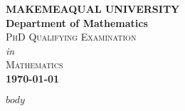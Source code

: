\documentclass[12pt]{article}
\begin{document}
\begin{titlepage}
	\begin{center}
        \textbf{\LARGE{MAKEMEAQUAL UNIVERSITY}} \\
                \vspace{2mm} %
            \textbf{\Large{Department of Mathematics}}\\
                \vspace{15mm} %
            \LARGE\textsc{PhD Qualifying Examination} \\
                \vspace{2mm} %
            \Large \textit{in} \\
            \Large\textsc {Mathematics}\\
                \vspace{30mm} %
            \textbf{\LARGE{\today}}
    \end{center}
\end{titlepage}

$body$
\end{document}
